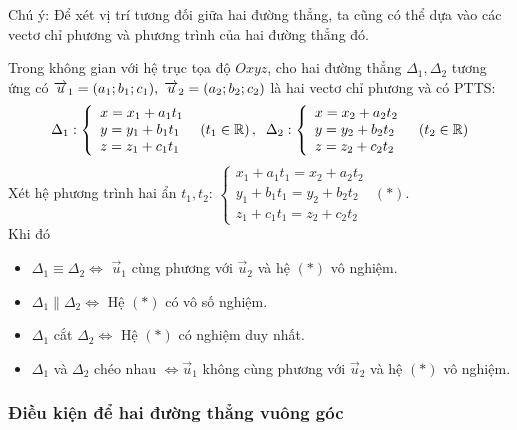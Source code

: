 \begin{note} Chú ý: Để xét vị trí tương đối giữa hai đường thẳng, ta cũng có thể dựa vào các vectơ chỉ phương và phương trình của hai đường thẳng đó.
\end{note}
 Trong không gian với hệ trục tọa độ $Oxyz$, cho hai đường thẳng $\Delta _{1} ,\Delta _{2} $ tương ứng có $\overrightarrow{u}_{1} =(a_{1} ;b_{1} ;c_{1} ),{\rm \; }\overrightarrow{u}_{2} =(a_{2} ;b_{2} ;c_{2} )$ là hai vectơ chỉ phương và có PTTS:
\[\Delta _{1} :\left\{\begin{array}{l} {x=x_{1} +a_{1} t_{1} } \\ {y=y_{1} +b_{1} t_{1} } \\ {z=z_{1} +c_{1} t_{1} } \end{array}\right. {\rm \; }\left(t_{1} \in  \mathbb{R}\right),{\rm \; \; }\Delta _{2} :\left\{\begin{array}{l} {x=x_{2} +a_{2} t_{2} } \\ {y=y_{2} +b_{2} t_{2} } \\ {z=z_{2} +c_{2} t_{2} } \end{array}\right. {\rm \; \; }\left(t_{2} \in  \mathbb{R}\right)\] 
 Xét hệ phương trình hai ẩn $t_{1} ,t_{2} $: $\left\{\begin{array}{l} {x_{1} +a_{1} t_{1} =x_{2} +a_{2} t_{2} } \\ {y_{1} +b_{1} t_{1} =y_{2} +b_{2} t_{2} } \\ {z_{1} +c_{1} t_{1} =z_{2} +c_{2} t_{2} } \end{array}\right. $ \quad$\left(*\right)$.\\
 Khi đó
\begin{itemize}
	\item  $\Delta _{1} \equiv \Delta _{2} \Leftrightarrow $ $\overrightarrow{u}_{1} $ cùng phương với $\overrightarrow{u}_{2} $ và hệ $\left(*\right)$ vô nghiệm.
	\item  $\Delta _{1} \parallel \Delta _{2} \Leftrightarrow $ Hệ $\left(*\right)$ có vô số nghiệm.
	\item  $\Delta _{1} $ cắt $\Delta _{2} \Leftrightarrow $ Hệ $\left(*\right)$ có nghiệm duy nhất.
	\item  $\Delta _{1} $ và $\Delta _{2} $ chéo nhau $\Leftrightarrow \overrightarrow{u}_{1} $ không cùng phương với $\overrightarrow{u}_{2} $ và hệ $\left(*\right)$ vô nghiệm.
\end{itemize}

\subsubsection{Điều kiện để hai đường thẳng vuông góc}

